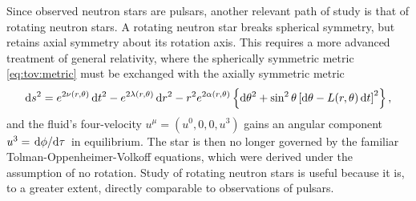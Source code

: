 Since observed neutron stars are pulsars, another relevant path of study is that of rotating neutron stars.
A rotating neutron star breaks spherical symmetry, but retains axial symmetry about its rotation axis.
This requires a more advanced treatment of general relativity, where the spherically symmetric metric \eqref{eq:tov:metric} must be exchanged with the axially symmetric metric
\cite[section 6]{ref:glendenning}
\begin{equation}
	\mathop{}\!\mathrm{d} s^2 = e^{2\nu(r,\theta)} \mathop{}\!\mathrm{d} t^2 - e^{2\lambda(r,\theta)} \mathop{}\!\mathrm{d} r^2 - r^2 e^{2 \alpha(r,\theta)} \left\{ \mathop{}\!\mathrm{d} \theta^2 + \sin^2 \theta \left[ \mathop{}\!\mathrm{d} \theta - L(r,\theta) \mathop{}\!\mathrm{d} t \right]^2 \right\} ,
\end{equation}
and the fluid's four-velocity $u^\mu = (u^0, 0, 0, u^3)$ gains an angular component $u^3 = \odv{\phi}/{\tau}$ in equilibrium.
The star is then no longer governed by the familiar Tolman-Oppenheimer-Volkoff equations, which were derived under the assumption of no rotation.
Study of rotating neutron stars is useful because it is, to a greater extent, directly comparable to observations of pulsars.

